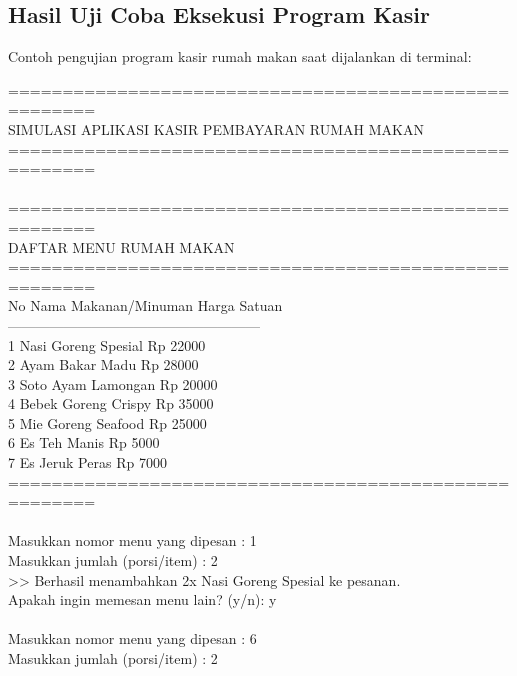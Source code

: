 \documentclass[12pt,a4paper]{article}
\begin{document}
\subsection{Hasil Uji Coba Eksekusi Program Kasir}
Contoh pengujian program kasir rumah makan saat dijalankan di terminal:
\begin{tcolorbox}[colback=black!90!white,coltext=green!90!white,fontupper=\ttfamily\footnotesize,title=\textbf{Terminal Output: Eksekusi Tugas 1}]
======================================================\\
     SIMULASI APLIKASI KASIR PEMBAYARAN RUMAH MAKAN   \\
======================================================\\
\\
======================================================\\
               DAFTAR MENU RUMAH MAKAN               \\
======================================================\\
No    Nama Makanan/Minuman            Harga Satuan\\
------------------------------------------------------\\
1     Nasi Goreng Spesial                   Rp 22000\\
2     Ayam Bakar Madu                       Rp 28000\\
3     Soto Ayam Lamongan                    Rp 20000\\
4     Bebek Goreng Crispy                   Rp 35000\\
5     Mie Goreng Seafood                    Rp 25000\\
6     Es Teh Manis                          Rp  5000\\
7     Es Jeruk Peras                        Rp  7000\\
======================================================\\
\\
Masukkan nomor menu yang dipesan : 1\\
Masukkan jumlah (porsi/item)    : 2\\
>> Berhasil menambahkan 2x Nasi Goreng Spesial ke pesanan.\\
Apakah ingin memesan menu lain? (y/n): y\\
\\
Masukkan nomor menu yang dipesan : 6\\
Masukkan jumlah (porsi/item)    : 2\\

\end{tcolorbox}
\end{document}
